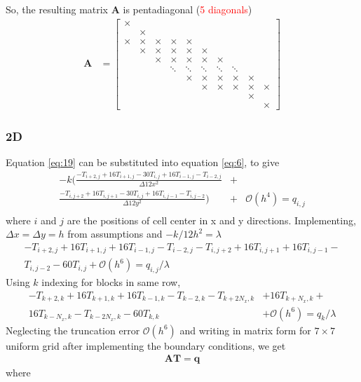 \documentclass[12pt]{amsart}   %
\begin{document}
So, the resulting matrix \textbf{A} is pentadiagonal (\textcolor{red}{5 diagonals})
\begin{align*}
                    \mathbf{A} &= \begin{bmatrix} 
                    \times\\
                     & \times &   \\
                    \times & \times & \times & \times & \times  \\
                    &\times & \times & \times & \times & \times  \\
                    && \times & \times & \times & \times & \times  \\
                    &&& \ddots & \ddots & \ddots & \ddots & \ddots  \\
                    &&&& \times & \times & \times & \times & \times \\
                    &&&&& \times & \times & \times & \times & \times\\
                    &&&&&&&  & \times & \\
                    &&&&&&&&& \times
                    \end{bmatrix}
                \end{align*}
                
\subsubsection{2D} Equation \ref{eq:19} can be substituted into equation \ref{eq:6}, to give
\begin{eqnarray}
-k \Bigg(\frac{-T_{i+2,j}+16T_{i+1,j} -30T_{i,j} + 16T_{i-1,j} - T_{i-2,j}}{\Delta 12x^2} &+& \nonumber \\ \frac{-T_{i,j+2}+16T_{i,j+1} -30T_{i,j} +
16T_{i,j-1} - T_{i,j-2}}{\Delta 12y^2} \Bigg) &+& \mathcal{O}(h^4) = q_{i,j} \nonumber\\
\end{eqnarray}
where $i$ and $j$ are the positions of cell center in x and y directions. Implementing, $\Delta x = \Delta y = h$ from assumptions and $-k/12h^2 = \lambda$
\begin{eqnarray}
-T_{i+2,j}+16T_{i+1,j}+16T_{i-1,j} -T_{i-2,j}-T_{i,j+2}+16T_{i,j+1}+16T_{i,j-1} - \nonumber \\ T_{i,j-2} -60T_{i,j}  +\mathcal{O}(h^6) = q_{i,j}/\lambda
\end{eqnarray}
Using $k$ indexing for blocks in same row, 
\begin{eqnarray}
-T_{k+2,k}+16T_{k+1,k}+16T_{k-1,k} -T_{k-2,k}-T_{k+2N_x,k}&+16T_{k+N_x,k}+ \nonumber \\ 16T_{k-N_x,k} - T_{k-2N_x,k}-60T_{k,k} &+\mathcal{O}(h^6) = q_{k}/\lambda
\end{eqnarray}
Neglecting the truncation error $\mathcal{O}(h^6)$ and writing in matrix form for $7 \times 7$ uniform grid after implementing the boundary conditions, we get
    \begin{align*}
                    \mathbf{AT} = \mathbf{q}
                \end{align*}
                where
\end{document}
